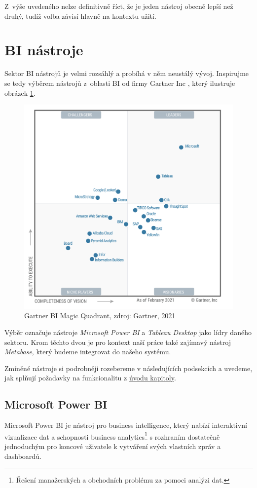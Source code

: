Z~výše uvedeného nelze definitivně říct, že je jeden nástroj obecně lepší než druhý, tudíž volba závisí hlavně na kontextu užití.

\section{BI nástroje}\label{sec:BITools}
Sektor BI nástrojů je velmi rozsáhlý a probíhá v něm neustálý vývoj. Inspirujme se tedy výběrem nástrojů z~oblasti BI od firmy Gartner Inc \cite{FIG:BiTools}, který ilustruje obrázek \ref{fig:BITools}.

\begin{figure}[hp]
    \centering
    \includegraphics[width=0.6\linewidth]{img/gartner-BI-tools.png}
    \caption{Gartner BI Magic Quadrant, zdroj: Gartner, 2021}
    \label{fig:BITools}
\end{figure}

Výběr označuje nástroje \textit{Microsoft Power BI} a \textit{Tableau Desktop} jako lídry daného sektoru. Krom těchto dvou je pro kontext naší práce také zajímavý nástroj \textit{Metabase}, který budeme integrovat do našeho systému.

Zmíněné nástroje si podrobněji rozebereme v následujících podsekcích a uvedeme, jak splňují požadavky na funkcionalitu z \hyperref[chap:analysis]{úvodu kapitoly}.

\subsection{Microsoft Power BI}\label{subsec:PowerBI}
Microsoft Power BI je nástroj pro business intelligence, který nabízí interaktivní vizualizace dat a schopnosti business analytics\footnote{Řešení manažerských a obchodních problému za pomoci analýzi dat.} s rozhraním dostatečně jednoduchým pro koncové uživatele k vytváření svých vlastních zpráv a dashboardů.

